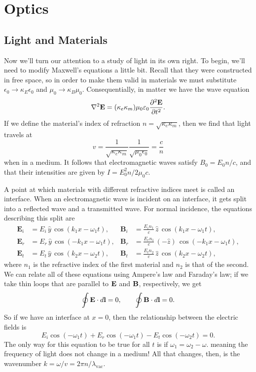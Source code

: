 \documentclass[../p051main.tex]{subfiles}
\begin{document}
\chapter{Optics}
\section{Light and Materials}
Now we'll turn our attention to a study of light in its own right.
To begin, we'll need to modify Maxwell's equations a little bit.
Recall that they were constructed in free space, so in order to make them valid in materials we must substitute $\epsilon_0 \to \kappa_E \epsilon_0$ and $\mu_0 \to \kappa_B \mu_0$.
Consequentially, in matter we have the wave equation
\[ \nabla^{2} \mathbf{E} = (\kappa_e \kappa_m) \mu_0 \varepsilon_0 \frac{\partial^{2} \mathbf{E}}{\partial t^2}. \]
If we define the material's index of refraction $n = \sqrt{\kappa_e \kappa_m}$, then we find that light travels at
\[ v = \frac{1}{\sqrt{\kappa_e \kappa_m}} \frac{1}{\sqrt{\mu_0 \epsilon_0}} = \frac{c}{n} \]
when in a medium.
It follows that electromagnetic waves satisfy $B_0 = E_0 n / c$, and that their intensities are given by $I = E_0^2 n / 2\mu_0 c$.

A point at which materials with different refractive indices meet is called an interface.
When an electromagnetic wave is incident on an interface, it gets split into a reflected wave and a transmitted wave.
For normal incidence, the equations describing this split are
\begin{align*}      
    \mathbf{E}_i &= E_i \,\hat{y}\, \cos (k_1 x - \omega_1 t), & \mathbf{B}_i &= \frac{E_i n_1}{c} \,\hat{z}\, \cos (k_1 x - \omega_1 t), \\
    \mathbf{E}_r &= E_r \,\hat{y}\, \cos (-k_1 x - \omega_1 t), & \mathbf{B}_r &= \frac{E_r n_1}{c} \,(-\hat{z})\, \cos (-k_1 x - \omega_1 t), \\
    \mathbf{E}_t &= E_t \,\hat{y}\, \cos (k_2 x - \omega_2 t), & \mathbf{B}_t &= \frac{E_t n_2}{c} \,\hat{z}\, \cos (k_2 x - \omega_2 t),
\end{align*}
where $n_1$ is the refractive index of the first material and $n_2$ is that of the second.
We can relate all of these equations using Ampere's law and Faraday's law; if we take thin loops that are parallel to $\mathbf{E}$ and $\mathbf{B}$, respectively, we get
\[ \oint \mathbf{E} \cdot d\mathbf{l} = 0, \qquad \oint \mathbf{B} \cdot d\mathbf{l} = 0. \]
So if we have an interface at $x=0$, then the relationship between the electric fields is
\[ E_i \cos(-\omega_1 t) + E_r \cos(-\omega_1 t) - E_t \cos (-\omega_2 t) = 0. \]
The only way for this equation to be true for all $t$ is if $\omega_1 = \omega_2 - \omega$. meaning the frequency of light does not change in a medium!
All that changes, then, is the wavenumber $k = \omega / v = 2\pi n / \lambda_\textrm{vac}$.
\end{document}
